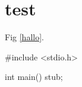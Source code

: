 \documentclass[a4paper,11pt,twoside]{report}
\begin{document}
\chapter{test}

Fig \ref{hallo}.

\begin{dosbox}[label={hallo},title={Een programma.}]
#include <stdio.h>

int main()
{
    stub;
}
\end{dosbox}
\end{document}

